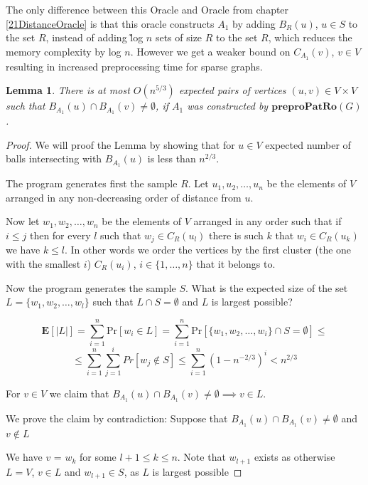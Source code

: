 \documentclass[shortabstract, lic, english]{iithesis}
\theoremstyle{definition} \newtheorem{definition}{Definition}[chapter]
\theoremstyle{remark} \newtheorem{remark}[definition]{Observation}
\theoremstyle{plain} \newtheorem{theorem}[definition]{Theorem}
\theoremstyle{plain} \newtheorem{lemma}[definition]{Lemma}
\theoremstyle{plain} \newtheorem{conjecture}[definition]{Conjecture}
\begin{document}
The only difference between this Oracle and Oracle from chapter \ref{21DistanceOracle} is that this oracle
constructs $A_1$ by adding $B_R(u)$, $u \in S$ to the set $R$, instead of adding \~log $n$ sets of size $R$ to the set $R$, which reduces the memory complexity by log $n$.
However we get a weaker bound on $C_{A_1}(v)$, $v \in V$ resulting in increased preprocessing time for sparse graphs.

\begin{lemma} \label{patRoBallIntersections}
    There is at most $O(n^{5/3})$ expected pairs of vertices $(u, v) \in V \times V$
    such that $B_{A_1}(u) \cap B_{A_1}(v) \neq \emptyset$,
    if $A_1$ was constructed by $\mathbf{preproPatRo}(G)$.
\end{lemma}

\begin{proof}
    We will proof the Lemma by showing that for $u \in V$ expected number of balls intersecting with $B_{A_1}(u)$ is less than $n^{2/3}$.

    The program generates first the sample $R$.
    Let $u_1, u_2, \ldots, u_n$ be the elements of $V$ arranged in any non-decreasing order of distance from $u$.

    Now let $w_1, w_2, \ldots, w_n$ be the elements of $V$ arranged in any order such that if $i \leq j$ then 
    for every $l$ such that $w_j \in C_R(u_l)$ there is such $k$ that $w_i \in C_R(u_k)$ we have $k \leq l$.
    In other words we order the vertices by the first cluster (the one with the smallest $i$) $C_R(u_i)$, $i \in \{1, \ldots, n\}$ that it belongs to.

    Now the program generates the sample $S$. What is the expected size of the set $L = \{w_1, w_2, \ldots, w_l\}$ such that $L \cap S = \emptyset$ and $L$ is largest possible?

    $$\mathbf{E}[|L|] = \sum_{i=1}^{n} \text{Pr}[w_i \in L] =\sum_{i=1}^{n} \text{Pr}[\{w_1, w_2, \ldots, w_i\} \cap S = \emptyset] \leq $$
    $$\leq \sum_{i=1}^{n} \sum_{j=1}^{i} Pr[w_j \notin S] \leq \sum_{i=1}^{n} (1 - n^{-2/3})^i < n^{2/3}$$

    For $v \in V$ we claim that $B_{A_1}(u) \cap B_{A_1}(v) \neq \emptyset \implies v \in L$.

    We prove the claim by contradiction: Suppose that $B_{A_1}(u) \cap B_{A_1}(v) \neq \emptyset$ and $v \notin L$

    We have $v$ = $w_k$ for some $l + 1 \leq k \leq n$. 
    Note that $w_{l+1}$ exists as otherwise $L = V$, $v \in L$ and $w_{l+1} \in S$, as $L$ is largest possible 
    

\end{proof}
\end{document}
